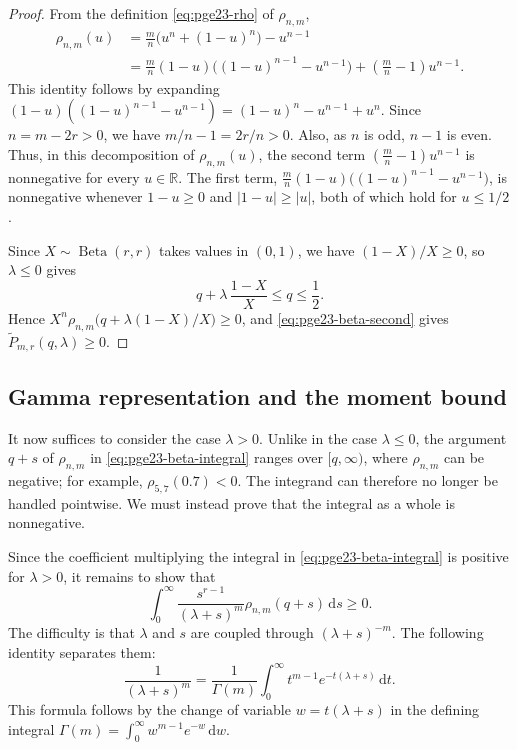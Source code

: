 \documentclass[11pt]{article}
\theoremstyle{remark}
\numberwithin{equation}{section}
\newcommand{\R}{\mathbb R}
\newcommand{\dd}{\,\mathrm d}
\newcommand{\BetaLaw}{\operatorname{Beta}}
\begin{document}
\begin{proof}
  From the definition \eqref{eq:pge23-rho} of $\rho_{n,m}$,
  \begin{align*}
    \rho_{n,m}(u)
    &=\frac {m}{n}\bigl(u^n+(1-u)^n\bigr)-u^{n-1} \\
    &=\frac {m}{n}(1-u)\bigl((1-u)^{n-1}-u^{n-1}\bigr)
    +\left(\frac {m}{n}-1\right)u^{n-1}.
  \end{align*}
  This identity follows by expanding
  $(1-u)((1-u)^{n-1}-u^{n-1})=(1-u)^n-u^{n-1}+u^n$.
  Since $n=m-2r>0$, we have $m/n-1=2r/n>0$.
  Also, as $n$ is odd, $n-1$ is even.
  Thus, in this decomposition of $\rho_{n,m}(u)$, the second term
  $\left(\frac{m}{n}-1\right)u^{n-1}$ is nonnegative for every
  $u\in\R$.
  The first term, $\frac{m}{n}(1-u)\bigl((1-u)^{n-1}-u^{n-1}\bigr)$,
  is nonnegative whenever $1-u\ge0$ and $|1-u|\ge|u|$, both of which hold
  for $u\le1/2$.

  Since $X\sim\BetaLaw(r,r)$ takes values in $(0,1)$, we have $(1-X)/X\ge0$, so $\lambda\le0$ gives
  \[
    q+\lambda\,\frac{1-X}{X}\le q\le\frac{1}{2}.
  \]
  Hence $X^n\rho_{n,m}\bigl(q+\lambda(1-X)/X\bigr)\ge0$, and \eqref{eq:pge23-beta-second} gives $\widetilde P_{m,r}(q,\lambda)\ge0$.
\end{proof}

\subsection{Gamma representation and the moment bound}
\label{subsec:gamma-positivity}

It now suffices to consider the case $\lambda>0$.
Unlike in the case $\lambda\le0$, the argument $q+s$ of $\rho_{n,m}$ in
\eqref{eq:pge23-beta-integral} ranges over $[q,\infty)$, where
$\rho_{n,m}$ can be negative; for example, $\rho_{5,7}(0.7)<0$.
The integrand can therefore no longer be handled pointwise. We must instead
prove that the integral as a whole is nonnegative.

Since the coefficient multiplying the integral in
\eqref{eq:pge23-beta-integral} is positive for $\lambda>0$, it remains to show that
\[
  \int_0^\infty
  \frac{s^{r-1}}{(\lambda+s)^m}\rho_{n,m}(q+s)\dd s\ge0.
\]
The difficulty is that $\lambda$ and $s$ are coupled through
$(\lambda+s)^{-m}$. The following identity separates
them:
\begin{equation}\label{eq:pge23-laplace-kernel}
  \frac{1}{(\lambda+s)^m}
  =\frac{1}{\Gamma(m)}\int_0^\infty t^{m-1}e^{-t(\lambda+s)}\dd t.
\end{equation}
This formula follows by the change of variable $w=t(\lambda+s)$ in the
defining integral $\Gamma(m)=\int_0^\infty w^{m-1}e^{-w}\dd w$.
\end{document}
